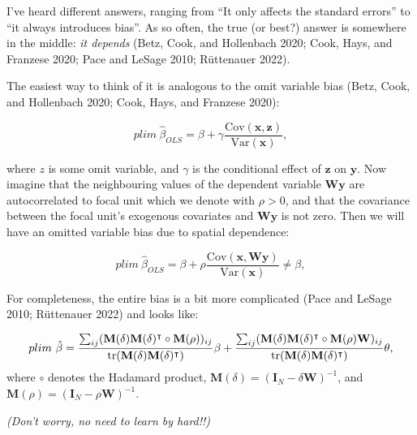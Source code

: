 \documentclass[
  letterpaper,
  DIV=11,
  numbers=noendperiod]{scrreprt}
\begin{document}
I've heard different answers, ranging from ``It only affects the
standard errors'' to ``it always introduces bias''. As so often, the
true (or best?) answer is somewhere in the middle: \emph{it depends}
(Betz, Cook, and Hollenbach 2020; Cook, Hays, and Franzese 2020; Pace
and LeSage 2010; Rüttenauer 2022).

The easiest way to think of it is analogous to the omit variable bias
(Betz, Cook, and Hollenbach 2020; Cook, Hays, and Franzese 2020):

\[
plim~\hat{\beta}_{OLS}= \beta  + \gamma \frac{\mathrm{Cov}(\boldsymbol{\mathbf{x}}, \boldsymbol{\mathbf{z}})}{\mathrm{Var}(\boldsymbol{\mathbf{x}})},
\]

where \(z\) is some omit variable, and \(\gamma\) is the conditional
effect of \(\boldsymbol{\mathbf{z}}\) on \(\boldsymbol{\mathbf{y}}\).
Now imagine that the neighbouring values of the dependent variable
\(\boldsymbol{\mathbf{W}} \boldsymbol{\mathbf{y}}\) are autocorrelated
to focal unit which we denote with \(\rho > 0\), and that the covariance
between the focal unit's exogenous covariates and
\(\boldsymbol{\mathbf{W}} \boldsymbol{\mathbf{y}}\) is not zero. Then we
will have an omitted variable bias due to spatial dependence:

\[
plim~\hat{\beta}_{OLS}= \beta  + \rho \frac{\mathrm{Cov}(\boldsymbol{\mathbf{x}}, \boldsymbol{\mathbf{W}} \boldsymbol{\mathbf{y}})}{\mathrm{Var}(\boldsymbol{\mathbf{x}})} \neq \beta,
\]

For completeness, the entire bias is a bit more complicated (Pace and
LeSage 2010; Rüttenauer 2022) and looks like:

\[
plim~\hat{\beta}=\frac{\sum_{ij}({\boldsymbol{\mathbf{M}}}(\delta){\boldsymbol{\mathbf{M}}}(\delta)^\intercal\circ{\boldsymbol{\mathbf{M}}}(\rho))_{ij}}
{\mathrm{tr}({\boldsymbol{\mathbf{M}}}(\delta){\boldsymbol{\mathbf{M}}}(\delta)^\intercal)}\beta \\
+\frac{\sum_{ij}({\boldsymbol{\mathbf{M}}}(\delta){\boldsymbol{\mathbf{M}}}(\delta)^\intercal\circ{\boldsymbol{\mathbf{M}}}(\rho){\boldsymbol{\mathbf{W}}})_{ij}}
{\mathrm{tr}({\boldsymbol{\mathbf{M}}}(\delta){\boldsymbol{\mathbf{M}}}(\delta)^\intercal)}\theta,
\] where \(\circ\) denotes the Hadamard product,
\({\boldsymbol{\mathbf{M}}}(\delta)=({\boldsymbol{\mathbf{I}}}_N-\delta{\boldsymbol{\mathbf{W}}})^{-1}\),
and
\({\boldsymbol{\mathbf{M}}}(\rho)=({\boldsymbol{\mathbf{I}}}_N-\rho{\boldsymbol{\mathbf{W}}})^{-1}\).

\emph{(Don't worry, no need to learn by hard!!)}
\end{document}
